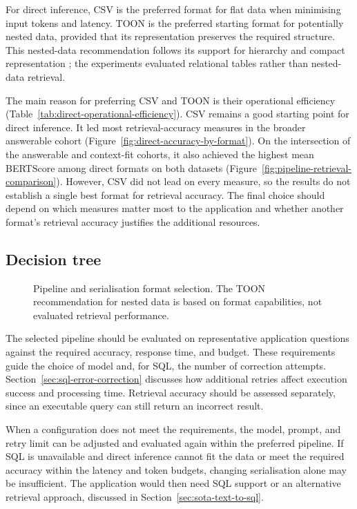 For direct inference, CSV is the preferred format for flat data when minimising input tokens and latency.
TOON is the preferred starting format for potentially nested data, provided that its representation preserves
the required structure. This nested-data recommendation follows its support for hierarchy and compact
representation \cite{toon-format-2025}; the experiments evaluated relational tables rather than nested-data retrieval.

The main reason for preferring CSV and TOON is their operational efficiency
(Table~\ref{tab:direct-operational-efficiency}). CSV remains a good starting point for direct inference. It led
most retrieval-accuracy measures in the broader answerable cohort (Figure~\ref{fig:direct-accuracy-by-format}).
On the intersection of the answerable and context-fit cohorts, it also achieved the highest mean BERTScore
among direct formats on both datasets (Figure~\ref{fig:pipeline-retrieval-comparison}). However, CSV did not
lead on every measure, so the results do not establish a single best format for retrieval accuracy. The final
choice should depend on which measures matter most to the application and whether another format's retrieval
accuracy justifies the additional resources.

\subsection{Decision tree}

\begin{figure}[p]   \centering   \resizebox{\textwidth}{!}{}
  \caption{Pipeline and serialisation format selection. The TOON recommendation for nested data is based on
  format capabilities, not evaluated retrieval performance.}   \label{fig:decision-framework}
\end{figure}

The selected pipeline should be evaluated on representative application questions against the required
accuracy, response time, and budget. These requirements guide the choice of model and, for SQL, the number of
correction attempts. Section~\ref{sec:sql-error-correction} discusses how additional retries affect execution
success and processing time. Retrieval accuracy should be assessed separately, since an executable query can
still return an incorrect result.

When a configuration does not meet the requirements, the model, prompt, and retry limit can be adjusted and
evaluated again within the preferred pipeline. If SQL is unavailable and direct inference cannot fit the data
or meet the required accuracy within the latency and token budgets, changing serialisation alone may be
insufficient. The application would then need SQL support or an alternative retrieval approach,  discussed in
Section~\ref{sec:sota-text-to-sql}.

